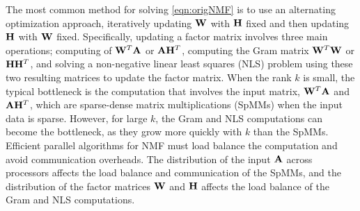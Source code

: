 

The most common method for solving \cref{eqn:origNMF} is to use an alternating optimization approach, iteratively updating $\WW$ with $\HH$ fixed and then updating $\HH$ with $\WW$ fixed.
Specifically, updating a factor matrix involves three main operations; computing of $\WW^T\AA$ or $\AA\Hm^T$, computing the Gram matrix $\Wm^T \Wm$ or $\Hm \Hm^T$, and solving a non-negative linear least squares (NLS) problem using these two resulting matrices to update the factor matrix.
When the rank $k$ is small, the typical bottleneck is the computation that involves the input matrix, $\WW^T\AA$ and $\AA\Hm^T$, which are sparse-dense matrix multiplications (SpMMs) when the input data is sparse.
However, for large $k$, the Gram and NLS computations can become the bottleneck, as they grow more quickly with $k$ than the SpMMs.
Efficient parallel algorithms for NMF must load balance the computation and avoid communication overheads.
The distribution of the input $\AA$ across processors affects the load balance and communication of the SpMMs, and the distribution of the factor matrices $\WW$ and $\HH$ affects the load balance of the Gram and NLS computations.

